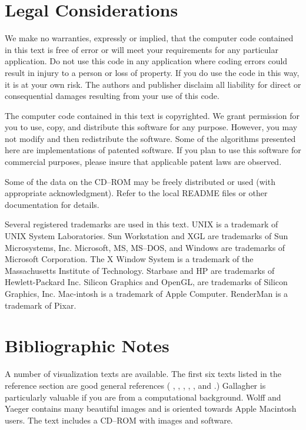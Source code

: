 \section{Legal Considerations}

We make no warranties, expressly or implied, that the computer code contained in this text is free of error or will meet your requirements for any particular application. Do not use this code in any application where coding errors could result in injury to a person or loss of property. If you do use the code in this way, it is at your own risk. The authors and publisher disclaim all liability for direct or consequential damages resulting from your use of this code.

The computer code contained in this text is copyrighted. We grant permission for you to use, copy, and distribute this software for any purpose. However, you may not modify and then redistribute the software. Some of the algorithms presented here are implementations of patented software. If you plan to use this software for commercial purposes, please insure that applicable patent laws are observed.

Some of the data on the CD--ROM may be freely distributed or used (with appropriate acknowledgment). Refer to the local README files or other documentation for details.

Several registered trademarks are used in this text. UNIX is a trademark of UNIX System Laboratories. Sun Workstation and XGL are trademarks of Sun Microsystems, Inc. Microsoft, MS, MS--DOS, and Windows are trademarks of Microsoft Corporation. The X Window System is a trademark of the Massachusetts Institute of Technology. Starbase and HP are trademarks of Hewlett-Packard Inc. Silicon Graphics and OpenGL, are trademarks of Silicon Graphics, Inc. Mac-intosh is a trademark of Apple Computer. RenderMan is a trademark of Pixar.
\section{Bibliographic Notes}

A number of visualization texts are available. The first six texts listed in the reference section are good general references ( \cite{Nielson90}, \cite{Patrikalakis91}, \cite{Brodlie92}, \cite{Wolff93}, \cite{Rosenblum94}, and\cite{Gallagher95} .) Gallagher \cite{Gallagher95} is particularly valuable if you are from a computational background. Wolff and Yaeger \cite{Wolff93} contains many beautiful images and is oriented towards Apple Macintosh users. The text includes a CD--ROM with images and software.

